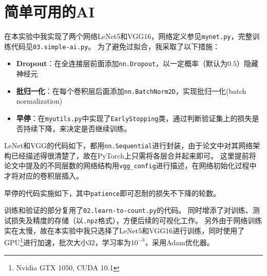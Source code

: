 \documentclass[logo,reportComp]{thesis}
\begin{document}
\section{简单可用的AI}
在本实验中我实现了两个网络LeNet5\cite{lenet}和VGG16\cite{vgg}，网络定义参见\verb'mynet.py'，完整训练代码见\verb'03.simple-ai.py'。
为了避免过拟合，我采取了以下措施：
\begin{itemize}
    \item \textbf{Dropout}：在全连接层前面添加\verb'nn.Dropout'，以一定概率（默认为$0.5$）隐藏神经元
    \item \textbf{批归一化}：在每个卷积层后面添加\verb'nn.BatchNorm2D'，实现批归一化(batch normalization)
    \item \textbf{早停}：在\verb'myutils.py'中实现了\verb'EarlyStopping'类，通过判断验证集上的损失是否持续下降，来决定是否继续训练。
\end{itemize}

LeNet和VGG的代码如下，都用\verb'nn.Sequential'进行封装，由于论文中对其网络架构已经描述得很清楚了，故在PyTorch上只需将各层合并起来即可。
这里提前将论文中提及的不同层数的网络结构用\verb'vgg_config'进行描述，在网络初始化过程中才将对应的卷积层插入。


早停的代码实施如下，其中\verb'patience'即可忍耐的损失不下降的轮数。


训练和验证的部分复用了\verb'02.learn-to-count.py'的代码。
同时增添了对训练、测试损失及精度的存储（以\verb'.npz'格式），方便后续的可视化工作。
另外由于网络训练实在太慢，故在本实验中我只选择了LeNet5和VGG16进行训练，同时使用了GPU\footnote{Nvidia GTX 1050, CUDA 10.1}进行加速，批次大小$32$，学习率为$10^{-3}$，采用Adam优化器。
\end{document}
